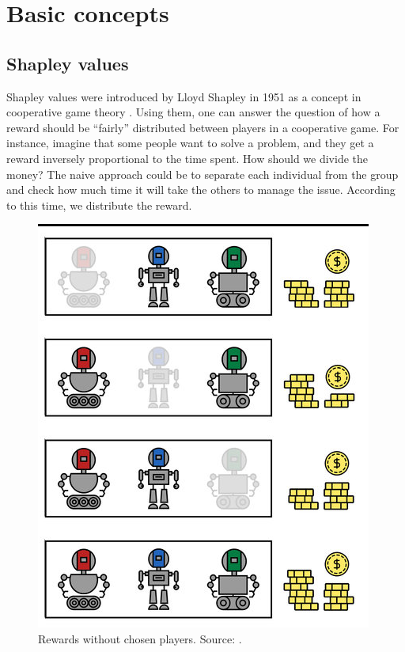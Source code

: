 \documentclass[magisterska,en]{pracamgr}
\begin{document}
\chapter{Basic concepts}\label{r:concepts}


\section{Shapley values}
Shapley values were introduced by Lloyd Shapley in 1951 as a concept in cooperative game theory \cite{ShapleyValues}.
Using them, one can answer the question of how a reward should be ``fairly'' distributed between players in a cooperative game. For instance, imagine that some people want to solve a problem, and they get a reward inversely proportional to the time spent. How should we divide the money? The naive approach could be to separate each individual from the group and check how much time it will take the others to manage the issue. According to this time, we distribute the reward.

\begin{figure}[H]
\centering
\includegraphics[scale=0.3]{./images/Shap_coal_2.png}
\caption{Rewards without chosen players. Source: \cite{DBLP:conf/ijcai/RozemberczkiWBY22}.}
\end{figure}
\end{document}
